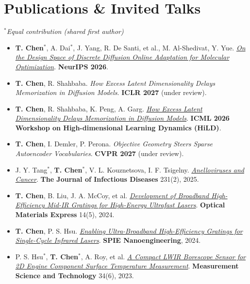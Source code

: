 \documentclass[letterpaper,10pt]{article}
\begin{document}
\section{Publications \& Invited Talks}
\small
$^*$\textit{Equal contribution (shared first author)}
\begin{itemize}[leftmargin=0.15in, label={}, itemsep=-1pt, topsep=0pt, parsep=0pt]
  \item \textbf{T. Chen}$^*$, A. Dai$^*$, J. Yang, R. De Santi, et al., M. Al-Shedivat, Y. Yue. \textit{\href{https://arxiv.org/abs/2607.02834}{On the Design Space of Discrete Diffusion Online Adaptation for Molecular Optimization}}. \textbf{NeurIPS 2026}.
  \item \textbf{T. Chen}, R. Shahbaba. \textit{How Excess Latent Dimensionality Delays Memorization in Diffusion Models}. \textbf{ICLR 2027} (under review).
  \item \textbf{T. Chen}, R. Shahbaba, K. Peng, A. Garg. \textit{\href{https://icml.cc/virtual/2026/72322}{How Excess Latent Dimensionality Delays Memorization in Diffusion Models}}. \textbf{ICML 2026 Workshop on High-dimensional Learning Dynamics (HiLD)}.
  \item \textbf{T. Chen}, I. Demler, P. Perona. \textit{Objective Geometry Steers Sparse Autoencoder Vocabularies}. \textbf{CVPR 2027} (under review).
  \item J. Y. Tang$^*$, \textbf{T. Chen}$^*$, V. L. Kouznetsova, I. F. Tsigelny. \textit{\href{https://doi.org/10.1093/infdis/jiae626}{Anelloviruses and Cancer}}. \textbf{The Journal of Infectious Diseases} 231(2), 2025.
  \item \textbf{T. Chen}, B. Liu, J. A. McCoy, et al. \textit{\href{https://opg.optica.org/ome/fulltext.cfm?uri=ome-14-5-1336&id=549158}{Development of Broadband High-Efficiency Mid-IR Gratings for High-Energy Ultrafast Lasers}}. \textbf{Optical Materials Express} 14(5), 2024.
  \item \textbf{T. Chen}, P. S. Hsu. \textit{\href{https://www.spiedigitallibrary.org/conference-proceedings-of-spie/13116/1311609/Enabling-ultra-broadband-high-efficiency-gratings-for-single-cycle-high/10.1117/12.3032561.short}{Enabling Ultra-Broadband High-Efficiency Gratings for Single-Cycle Infrared Lasers}}. \textbf{SPIE Nanoengineering}, 2024.
  \item P. S. Hsu$^*$, \textbf{T. Chen}$^*$, A. Roy, et al. \textit{\href{https://iopscience.iop.org/article/10.1088/1361-6501/acc048}{A Compact LWIR Borescope Sensor for 2D Engine Component Surface Temperature Measurement}}. \textbf{Measurement Science and Technology} 34(6), 2023.

\end{itemize}
\end{document}
